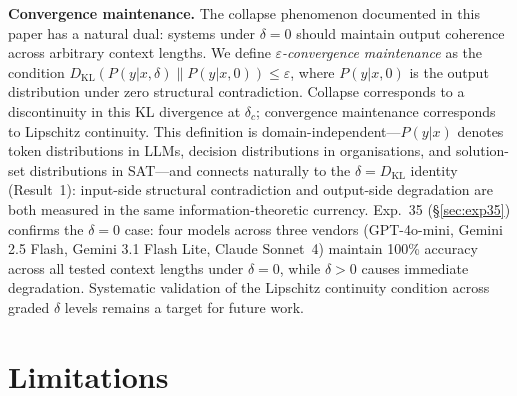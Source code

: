 \documentclass[11pt,a4paper]{article}
\begin{document}
\textbf{Convergence maintenance.} The collapse phenomenon documented in this paper has a natural dual: systems under $\delta = 0$ should maintain output coherence across arbitrary context lengths. We define \emph{$\varepsilon$-convergence maintenance} as the condition $D_{\text{KL}}(P(y|x, \delta) \| P(y|x, 0)) \leq \varepsilon$, where $P(y|x, 0)$ is the output distribution under zero structural contradiction. Collapse corresponds to a discontinuity in this KL divergence at $\delta_c$; convergence maintenance corresponds to Lipschitz continuity. This definition is domain-independent---$P(y|x)$ denotes token distributions in LLMs, decision distributions in organisations, and solution-set distributions in SAT---and connects naturally to the $\delta = D_{\text{KL}}$ identity (Result~1): input-side structural contradiction and output-side degradation are both measured in the same information-theoretic currency. Exp.~35 (\S\ref{sec:exp35}) confirms the $\delta = 0$ case: four models across three vendors (GPT-4o-mini, Gemini 2.5 Flash, Gemini 3.1 Flash Lite, Claude Sonnet~4) maintain 100\% accuracy across all tested context lengths under $\delta = 0$, while $\delta > 0$ causes immediate degradation. Systematic validation of the Lipschitz continuity condition across graded $\delta$ levels remains a target for future work.

\section{Limitations}
\label{sec:limitations}
\end{document}
